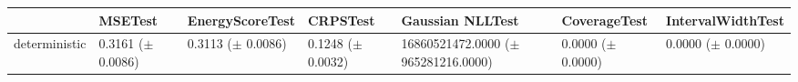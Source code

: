 \begin{tabular}{lllllll}
\toprule
 & MSETest & EnergyScoreTest & CRPSTest & Gaussian NLLTest & CoverageTest & IntervalWidthTest \\
\midrule
deterministic & \makecell{0.3161 \\ ($\pm$ 0.0086)} & \makecell{0.3113 \\ ($\pm$ 0.0086)} & \makecell{0.1248 \\ ($\pm$ 0.0032)} & \makecell{16860521472.0000 \\ ($\pm$ 965281216.0000)} & \makecell{0.0000 \\ ($\pm$ 0.0000)} & \makecell{0.0000 \\ ($\pm$ 0.0000)} \\
\bottomrule
\end{tabular}
